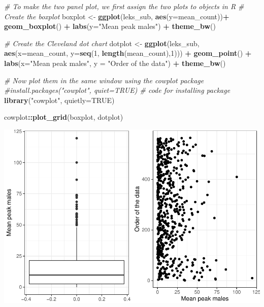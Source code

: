 \documentclass[
]{book}
\newenvironment{Shaded}{\begin{snugshade}}{\end{snugshade}}
\newcommand{\AttributeTok}[1]{\textcolor[rgb]{0.13,0.29,0.53}{#1}}
\newcommand{\CommentTok}[1]{\textcolor[rgb]{0.56,0.35,0.01}{\textit{#1}}}
\newcommand{\ConstantTok}[1]{\textcolor[rgb]{0.56,0.35,0.01}{#1}}
\newcommand{\DecValTok}[1]{\textcolor[rgb]{0.00,0.00,0.81}{#1}}
\newcommand{\FunctionTok}[1]{\textcolor[rgb]{0.13,0.29,0.53}{\textbf{#1}}}
\newcommand{\NormalTok}[1]{#1}
\newcommand{\OtherTok}[1]{\textcolor[rgb]{0.56,0.35,0.01}{#1}}
\newcommand{\SpecialCharTok}[1]{\textcolor[rgb]{0.81,0.36,0.00}{\textbf{#1}}}
\newcommand{\StringTok}[1]{\textcolor[rgb]{0.31,0.60,0.02}{#1}}
\begin{document}
\begin{Shaded}
\begin{Highlighting}[]
\CommentTok{\# To make the two panel plot, we first assign the two plots to objects in R}
\CommentTok{\# Create the boxplot}
\NormalTok{boxplot }\OtherTok{\textless{}{-}} \FunctionTok{ggplot}\NormalTok{(leks\_sub, }\FunctionTok{aes}\NormalTok{(}\AttributeTok{y=}\NormalTok{mean\_count))}\SpecialCharTok{+}   
            \FunctionTok{geom\_boxplot}\NormalTok{() }\SpecialCharTok{+}   
            \FunctionTok{labs}\NormalTok{(}\AttributeTok{y=}\StringTok{"Mean peak males"}\NormalTok{) }\SpecialCharTok{+}   
            \FunctionTok{theme\_bw}\NormalTok{()}

\CommentTok{\# Create the Cleveland dot chart}
\NormalTok{dotplot }\OtherTok{\textless{}{-}} \FunctionTok{ggplot}\NormalTok{(leks\_sub, }\FunctionTok{aes}\NormalTok{(}\AttributeTok{x=}\NormalTok{mean\_count, }\AttributeTok{y=}\FunctionTok{seq}\NormalTok{(}\DecValTok{1}\NormalTok{, }\FunctionTok{length}\NormalTok{(mean\_count),}\DecValTok{1}\NormalTok{))) }\SpecialCharTok{+}   
            \FunctionTok{geom\_point}\NormalTok{() }\SpecialCharTok{+}   
            \FunctionTok{labs}\NormalTok{(}\AttributeTok{x=}\StringTok{"Mean peak males"}\NormalTok{, }\AttributeTok{y =} \StringTok{"Order of the data"}\NormalTok{) }\SpecialCharTok{+}    
            \FunctionTok{theme\_bw}\NormalTok{()}

\CommentTok{\# Now plot them in the same window using the cowplot package}
\CommentTok{\#install.packages("cowplot", quiet=TRUE) \# code for installing package}
\FunctionTok{library}\NormalTok{(}\StringTok{"cowplot"}\NormalTok{, }\AttributeTok{quietly=}\ConstantTok{TRUE}\NormalTok{)}

\NormalTok{cowplot}\SpecialCharTok{::}\FunctionTok{plot\_grid}\NormalTok{(boxplot, dotplot)}
\end{Highlighting}
\end{Shaded}

\includegraphics{series_files/figure-latex/unnamed-chunk-31-1.pdf}
\end{document}
